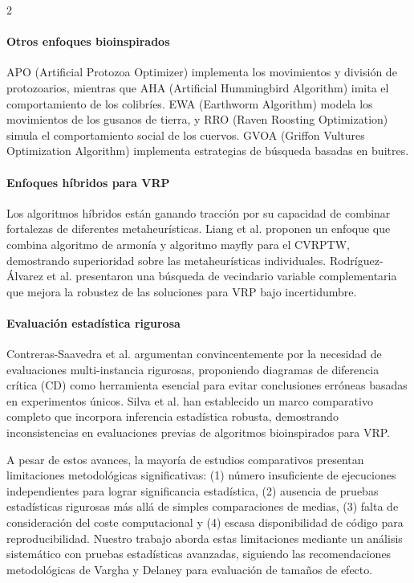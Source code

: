 \documentclass[10pt,a4paper]{extarticle}
\begin{document}
\begin{multicols}{2}
\paragraph{Otros enfoques bioinspirados} APO (Artificial Protozoa Optimizer) implementa los movimientos y división de protozoarios, mientras que AHA (Artificial Hummingbird Algorithm) imita el comportamiento de los colibríes. EWA (Earthworm Algorithm) modela los movimientos de los gusanos de tierra, y RRO (Raven Roosting Optimization) simula el comportamiento social de los cuervos. GVOA (Griffon Vultures Optimization Algorithm) implementa estrategias de búsqueda basadas en buitres.

\paragraph{Enfoques híbridos para VRP} Los algoritmos híbridos están ganando tracción por su capacidad de combinar fortalezas de diferentes metaheurísticas. Liang et al. proponen un enfoque que combina algoritmo de armonía y algoritmo mayfly para el CVRPTW, demostrando superioridad sobre las metaheurísticas individuales. Rodríguez-Álvarez et al. presentaron una búsqueda de vecindario variable complementaria que mejora la robustez de las soluciones para VRP bajo incertidumbre.

\paragraph{Evaluación estadística rigurosa} Contreras-Saavedra et al. argumentan convincentemente por la necesidad de evaluaciones multi-instancia rigurosas, proponiendo diagramas de diferencia crítica (CD) como herramienta esencial para evitar conclusiones erróneas basadas en experimentos únicos. Silva et al. han establecido un marco comparativo completo que incorpora inferencia estadística robusta, demostrando inconsistencias en evaluaciones previas de algoritmos bioinspirados para VRP.

A pesar de estos avances, la mayoría de estudios comparativos presentan limitaciones metodológicas significativas: (1) número insuficiente de ejecuciones independientes para lograr significancia estadística, (2) ausencia de pruebas estadísticas rigurosas más allá de simples comparaciones de medias, (3) falta de consideración del coste computacional y (4) escasa disponibilidad de código para reproducibilidad. Nuestro trabajo aborda estas limitaciones mediante un análisis sistemático con pruebas estadísticas avanzadas, siguiendo las recomendaciones metodológicas de Vargha y Delaney para evaluación de tamaños de efecto.


\end{multicols}
\end{document}
